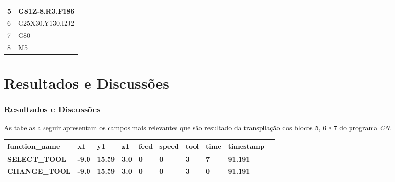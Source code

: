 \documentclass[aspectratio=169]{beamer}
\begin{document}
{\begin{frame}[fragile]
\begin{tabular}{l|l}
    \scriptsize{5} & \scriptsize{G81Z-8.R3.F186} \\
    \hline

    \scriptsize{6} & \scriptsize{G25X30.Y130.I2J2} \\
    \hline

    \scriptsize{7} & \scriptsize{G80} \\
    \hline

    \scriptsize{8} & \scriptsize{M5} \\
    \hline
      
  \end{tabular}

\end{frame}  


\section{Resultados e Discussões}

\begin{frame}[fragile]
  \frametitle{Resultados e Discussões}

  As tabelas a seguir apresentam os campos mais relevantes que são 
  resultado da transpilação dos blocos 5, 6 e 7 do programa \emph{CN}.

  \vspace{3mm}

  \begin{tabular}{|l|l|l|l|l|l|l|l|l|l|}

    \hline

    \tiny{\bfseries{function\_name}} & 
    \tiny{\bfseries{x1}} & 
    \tiny{\bfseries{y1}} & 
    \tiny{\bfseries{z1}} & 
    \tiny{\bfseries{feed}} & 
    \tiny{\bfseries{speed}} & 
    \tiny{\bfseries{tool}} & 
    \tiny{\bfseries{time}} & 
    \tiny{\bfseries{timestamp}} \\
    \hline

    \tiny{\bfseries{SELECT\_TOOL}} & 
    \tiny{\bfseries{-9.0}} & 
    \tiny{\bfseries{15.59}} & 
    \tiny{\bfseries{3.0}} & 
    \tiny{\bfseries{0}} & 
    \tiny{\bfseries{0}} & 
    \tiny{\bfseries{3}} & 
    \tiny{\bfseries{7}} & 
    \tiny{\bfseries{91.191}} \\    
    \hline

    \tiny{\bfseries{CHANGE\_TOOL}} & 
    \tiny{\bfseries{-9.0}} & 
    \tiny{\bfseries{15.59}} & 
    \tiny{\bfseries{3.0}} & 
    \tiny{\bfseries{0}} & 
    \tiny{\bfseries{0}} & 
    \tiny{\bfseries{3}} & 
    \tiny{\bfseries{0}} & 
    \tiny{\bfseries{91.191}} \\
    \hline


\end{tabular}
\end{frame}}
\end{document}
